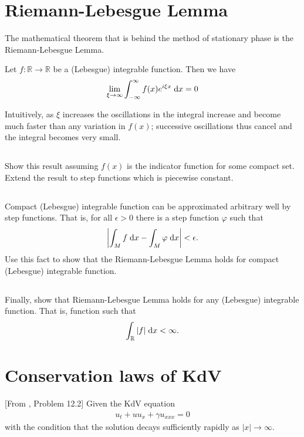 \documentclass[11pt,letterpaper]{report}
\begin{document}
\section{Riemann-Lebesgue Lemma}
The mathematical theorem that is behind the method of stationary phase is the Riemann-Lebesgue Lemma. 
\begin{displayquote}
    Let $f:\mathbb{R}\to\mathbb{R}$ be a (Lebesgue) integrable function. Then we have
    \begin{align}
        \lim_{\xi\to\infty} \int^\infty_{-\infty} f(x)e^{i\xi x}\;\mathrm{d} x = 0
    \end{align}
\end{displayquote}
Intuitively, as $\xi$ increases the oscillations in the integral increase and become much faster than any variation in $f(x)$; successive oscillations thus cancel and the integral becomes very small.

\subsection{}
Show this result assuming $f(x)$ is the indicator function for some compact set. Extend the result to step functions which is piecewise constant. 

\subsection{}
Compact (Lebesgue) integrable function can be approximated arbitrary well by step functions. That is, for all $\epsilon>0$ there is a step function $\varphi$ such that
\begin{align}
    \left| \int_M f \;\mathrm{d} x - \int_M \varphi \;\mathrm{d} x \right| < \epsilon.
\end{align}
Use this fact to show that the Riemann-Lebesgue Lemma holds for compact (Lebesgue) integrable function.

\subsection{}
Finally, show that Riemann-Lebesgue Lemma holds for any (Lebesgue) integrable function. That is, function such that
\begin{align}
    \int_\mathbb{R} |f|\;\mathrm{d} x < \infty.
\end{align}

\section{Conservation laws of KdV}
[From \cite{ShearerLevy_15}, Problem 12.2] Given the KdV equation
\begin{align}
    u_t+uu_x+\gamma u_{xxx} = 0
\end{align}
with the condition that the solution decays sufficiently rapidly as $|x|\to\infty$.
\end{document}
